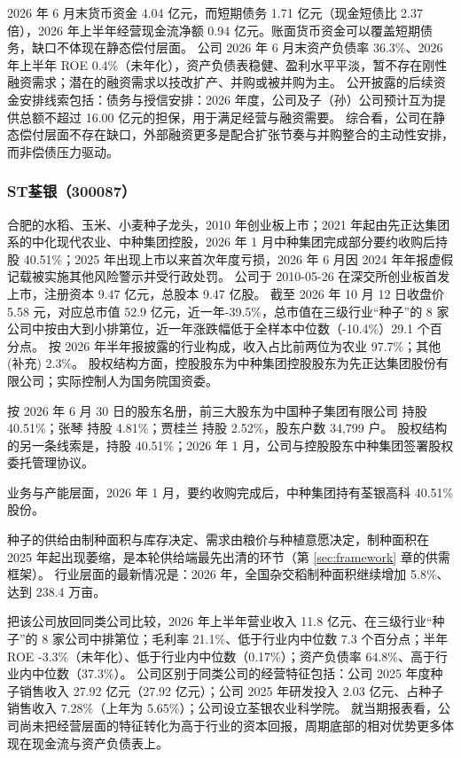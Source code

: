  2026 年 6 月末货币资金 4.04 亿元，而短期债务 1.71 亿元（现金短债比 2.37 倍），2026 年上半年经营现金流净额 0.94 亿元。账面货币资金可以覆盖短期债务，缺口不体现在静态偿付层面。 公司 2026 年 6 月末资产负债率 36.3\%、2026 年上半年 ROE 0.4\%（未年化），资产负债表稳健、盈利水平平淡，暂不存在刚性融资需求；潜在的融资需求以技改扩产、并购或被并购为主。 公开披露的后续资金安排线索包括：债务与授信安排：2026 年度，公司及子（孙）公司预计互为提供总额不超过 16.00 亿元的担保，用于满足经营与融资需要。 综合看，公司在静态偿付层面不存在缺口，外部融资更多是配合扩张节奏与并购整合的主动性安排，而非偿债压力驱动。




\subsubsection{ST荃银（300087）}
\label{co:300087}

 合肥的水稻、玉米、小麦种子龙头，2010 年创业板上市；2021 年起由先正达集团系的中化现代农业、中种集团控股，2026 年 1 月中种集团完成部分要约收购后持股 40.51\%；2025 年出现上市以来首次年度亏损，2026 年 6 月因 2024 年年报虚假记载被实施其他风险警示并受行政处罚。 公司于 2010-05-26 在深交所创业板首发上市，注册资本 9.47 亿元，总股本 9.47 亿股。 截至 2026 年 10 月 12 日收盘价 5.58 元，对应总市值 52.9 亿元，近一年-39.5\%，总市值在三级行业“种子”的 8 家公司中按由大到小排第位，近一年涨跌幅低于全样本中位数（-10.4\%）29.1 个百分点。 按 2026 年半年报披露的行业构成，收入占比前两位为农业 97.7\%；其他(补充) 2.3\%。 股权结构方面，控股股东为中种集团控股股东为先正达集团股份有限公司；实际控制人为国务院国资委。

 按 2026 年 6 月 30 日的股东名册，前三大股东为中国种子集团有限公司 持股 40.51\%；张琴 持股 4.81\%；贾桂兰 持股 2.52\%，股东户数 34,799 户。 股权结构的另一条线索是，持股 40.51\%；2026 年 1 月，公司与控股股东中种集团签署股权委托管理协议。

 业务与产能层面，2026 年 1 月，要约收购完成后，中种集团持有荃银高科 40.51\% 股份。

 种子的供给由制种面积与库存决定、需求由粮价与种植意愿决定，制种面积在 2025 年起出现萎缩，是本轮供给端最先出清的环节（第 \ref{sec:framework} 章的供需框架）。 行业层面的最新情况是：2026 年，全国杂交稻制种面积继续增加 5.8\%、达到 238.4 万亩。

 把该公司放回同类公司比较，2026 年上半年营业收入 11.8 亿元、在三级行业“种子”的 8 家公司中排第位；毛利率 21.1\%、低于行业内中位数 7.3 个百分点；半年 ROE -3.3\%（未年化）、低于行业内中位数（0.17\%）；资产负债率 64.8\%、高于行业内中位数（37.3\%）。 公司区别于同类公司的经营特征包括：公司 2025 年度种子销售收入 27.92 亿元（27.92 亿元）；公司 2025 年研发投入 2.03 亿元、占种子销售收入 7.28\%（上年为 5.65\%）；公司设立荃银农业科学院。 就当期报表看，公司尚未把经营层面的特征转化为高于行业的资本回报，周期底部的相对优势更多体现在现金流与资产负债表上。

